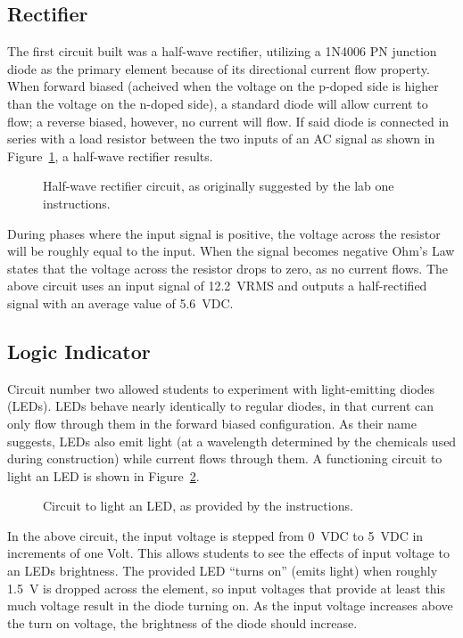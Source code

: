 \subsection{Rectifier}
The first circuit built was a half-wave rectifier, utilizing a 1N4006 PN
junction diode as the primary element because of its directional current flow
property.  When forward biased (acheived when the voltage on the p-doped side
is higher than the voltage on the n-doped side), a standard diode will allow
current to flow; a reverse biased, however, no current will flow.  If said
diode is connected in series with a load resistor between the two inputs of an
AC signal as shown in Figure~\ref{fig:schem1}, a half-wave rectifier results.
%
\begin{figure}[H]
	\centering
	
	\caption{Half-wave rectifier circuit, as originally suggested by the lab one instructions.}
	\label{fig:schem1}
\end{figure}
%
During phases where the input signal is positive, the voltage across the
resistor will be roughly equal to the input.  When the signal becomes negative
Ohm's Law states that the voltage across the resistor drops to zero, as no
current flows.  The above circuit uses an input signal of \SI{12.2}{\volt}RMS
and outputs a half-rectified signal with an average value of \SI{5.6}{\volt}DC.

\subsection{Logic Indicator}
Circuit number two allowed students to experiment with light-emitting diodes
(LEDs).  LEDs behave nearly identically to regular diodes, in that current can
only flow through them in the forward biased configuration.  As their name
suggests, LEDs also emit light (at a wavelength determined by the chemicals
used during construction) while current flows through them.  A functioning
circuit to light an LED is shown in Figure~\ref{fig:schem2}.
%
\begin{figure}[H]
	\centering
	
	\caption{Circuit to light an LED, as provided by the instructions.}
	\label{fig:schem2}
\end{figure}
%
In the above circuit, the input voltage is stepped from \SI{0}{\volt}DC to
\SI{5}{\volt}DC in increments of one Volt.  This allows students to see the
effects of input voltage to an LEDs brightness.  The provided LED ``turns on''
(emits light) when roughly \SI{1.5}{\volt} is dropped across the element, so
input voltages that provide at least this much voltage result in the diode
turning on.  As the input voltage increases above the turn on voltage, the
brightness of the diode should increase.


